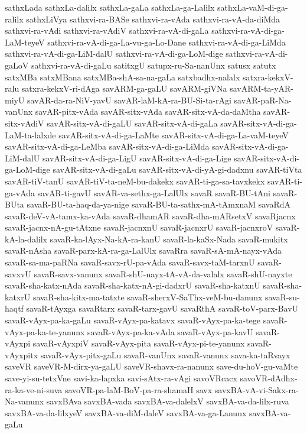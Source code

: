 {sathxLada
sathxLa-dalilx
sathxLa-gaLa
sathxLa-ga-Lalilx
sathxLa-vaM-di-ga-ralilx
sathxLiVya
sathxvi-ra-BASe
sathxvi-ra-vAda
sathxvi-ra-vA-da-diMda
sathxvi-ra-vAdi
sathxvi-ra-vAdiV
sathxvi-ra-vA-di-gaLa
sathxvi-ra-vA-di-ga-LaM-teyeV
sathxvi-ra-vA-di-ga-La-vu-ga-Lo-Dane
sathxvi-ra-vA-di-ga-LiMda
sathxvi-ra-vA-di-ga-LiM-dalU
sathxvi-ra-vA-di-ga-LoM-dige
sathxvi-ra-vA-di-gaLoV
sathxvi-ra-vA-di-gaLu
satitxgU
satupx-ru-Sa-nanUnx
satusx
satutx
satxMBa
satxMBana
satxMBa-shA-sa-na-gaLa
satxbadhx-nalalx
satxra-kekxV-ralu
satxra-kekxV-ri-dAga
savARM-ga-gaLU
savARM-giVNa
savARM-ta-yAR-miyU
savAR-da-ra-NiV-yavU
savAR-laM-kA-ra-BU-Si-ta-rAgi
savAR-paR-Na-vanUnx
savAR-pitx-vAda
savAR-sitx-vAda
savAR-sitx-vA-da-daMtha
savAR-sitx-vAdiV
savAR-sitx-vA-di-gaLU
savAR-sitx-vA-di-gaLa
savAR-sitx-vA-di-ga-LaM-ta-lalxde
savAR-sitx-vA-di-ga-LaMte
savAR-sitx-vA-di-ga-La-vaM-teyeV
savAR-sitx-vA-di-ga-LeMba
savAR-sitx-vA-di-ga-LiMda
savAR-sitx-vA-di-ga-LiM-dalU
savAR-sitx-vA-di-ga-LigU
savAR-sitx-vA-di-ga-Lige
savAR-sitx-vA-di-ga-LoM-dige
savAR-sitx-vA-di-gaLu
savAR-sitx-vA-di-yA-gi-dadxnu
savAR-tiVta
savAR-tiV-tanU
savAR-tiV-ta-neM-bu-dakekx
savAR-ti-ga-sa-tavxkekx
savAR-ti-ga-vAda
savAR-ti-gavU
savAR-va-sethx-ga-LalUlx
savaR
savaR-BU-tAni
savaR-BUta
savaR-BU-ta-haq-da-ya-nige
savaR-BU-ta-sathx-mA-tAmxnaM
savaRdA
savaR-deV-vA-tamx-ka-vAda
savaR-dhamAR
savaR-dha-mARsetxV
savaRjacnx
savaR-jacnx-nA-gu-tAtxne
savaR-jacnxnU
savaR-jacnxrU
savaR-jacnxroV
savaR-kA-la-dalilx
savaR-ka-lAyx-Na-kA-ra-kanU
savaR-la-kaSx-Nada
savaR-mukitx
savaR-nAsha
savaR-parx-kA-ra-ga-LalUlx
savaRra
savaR-sA-mA-nayx-vAda
savaR-sa-ma-paRNa
savaR-savx-rU-pa-vAda
savaR-savx-taM-tarxnU
savaR-savxvU
savaR-savx-vanunx
savaR-shU-nayx-tA-vA-da-valalx
savaR-shU-nayxte
savaR-sha-katx-nAda
savaR-sha-katx-nA-gi-dadxrU
savaR-sha-katxnU
savaR-sha-katxrU
savaR-sha-kitx-ma-tatxte
savaR-sherxV-SaThx-veM-bu-danunx
savaR-su-haqtf
savaR-tAyxga
savaRtarx
savaR-tarx-gavU
savaRthA
savaR-toV-parx-BavU
savaR-vAyx-pa-ka-gaLu
savaR-vAyx-pa-katavx
savaR-vAyx-pa-ka-tege
savaR-vAyx-pa-ka-te-yanunx
savaR-vAyx-pa-ka-vAda
savaR-vAyx-pa-kavU
savaR-vAyxpi
savaR-vAyxpiV
savaR-vAyx-pita
savaR-vAyx-pi-te-yanunx
savaR-vAyxpitx
savaR-vAyx-pitx-gaLu
savaR-vanUnx
savaR-vanunx
sava-ka-taRvayx
saveVR
saveVR-M-dirx-ya-gaLU
saveVR-shavx-ra-nanunx
save-du-hoV-gu-vaMte
save-yi-su-tetxVne
savi-ka-lapxka
savi-sAtx-ra-vAgi
savoVRcacx
savoVR-dAdhx-ra-ka-ve-ni-suva
savoVR-pa-laM-BoV-pa-ra-shamaH
savx
savxBA-vA-vi-Sakx-ra-Na-vanunx
savxBAva
savxBA-vada
savxBA-va-dalelxV
savxBA-va-da-lilx-ruva
savxBA-va-da-lilxyeV
savxBA-va-diM-daleV
savxBA-va-ga-Lanunx
savxBA-va-gaLu
}
